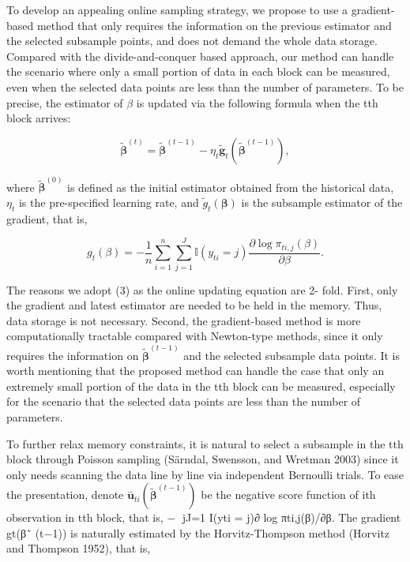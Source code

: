 \documentclass[
  10
]{article}
\begin{document}
To develop an appealing online sampling strategy, we propose to use a
gradient-based method that only requires the information on the previous
estimator and the selected subsample points, and does not demand the
whole data storage. Compared with the divide-and-conquer based approach,
our method can handle the scenario where only a small portion of data in
each block can be measured, even when the selected data points are less
than the number of parameters. To be precise, the estimator of \(\beta\)
is updated via the following formula when the tth block arrives:

\[
\tilde { \pmb { \beta } } ^ { ( t ) } = \tilde { \pmb { \beta } } ^ { ( t - 1 ) } - \eta _ { t } \tilde { \pmb { g } } _ { t } ( \tilde { \pmb { \beta } } ^ { ( t - 1 ) } ) ,
\]

where \(\tilde { \pmb { \beta } } ^ { ( 0 ) }\) is defined as the
initial estimator obtained from the historical data, \(\eta _ { t }\) is
the pre-specified learning rate, and
\(\tilde { g } _ { t } ( \pmb { \beta } )\) is the subsample estimator
of the gradient, that is,

\[
g _ { t } ( \beta ) = - \frac { 1 } { n } \sum _ { i = 1 } ^ { n } \sum _ { j = 1 } ^ { J } \mathbb { I } ( y _ { t i } = j ) \frac { \partial \log \pi _ { t i , j } ( \beta ) } { \partial \beta } .
\]

The reasons we adopt (3) as the online updating equation are 2- fold.
First, only the gradient and latest estimator are needed to be held in
the memory. Thus, data storage is not necessary. Second, the
gradient-based method is more computationally tractable compared with
Newton-type methods, since it only requires the information on
\(\tilde { \pmb { \beta } } ^ { ( t - 1 ) }\) and the selected subsample
data points. It is worth mentioning that the proposed method can handle
the case that only an extremely small portion of the data in the tth
block can be measured, especially for the scenario that the selected
data points are less than the number of parameters.

To further relax memory constraints, it is natural to select a subsample
in the tth block through Poisson sampling (Särndal, Swensson, and
Wretman 2003) since it only needs scanning the data line by line via
independent Bernoulli trials. To ease the presentation, denote
\(\overset { - } { \pmb { u } } _ { t i } ( { \tilde { \pmb { \beta } } } ^ { ( t - 1 ) } )\)
be the negative score function of ith observation in tth block, that is,
− jJ=1 I(yti = j)∂ log πti,j(β)/∂β. The gradient gt(β˜ (t−1)) is
naturally estimated by the Horvitz-Thompson method (Horvitz and Thompson
1952), that is,
\end{document}
